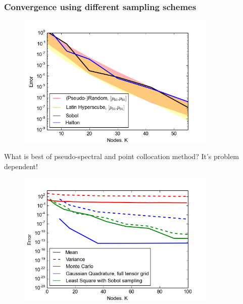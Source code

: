 \documentclass{beamer}
\begin{document}
\begin{frame}
 \frametitle{Convergence using different sampling schemes}
  \begin{figure}
  \includegraphics[width=0.85\textwidth]{convergence_collocation_compare.png}
 \end{figure}
\end{frame}



\begin{frame}{What is best of pseudo-spectral and point collocation method? It's problem dependent!}{}
      \begin{figure}
  \includegraphics[width=0.85\textwidth]{MC_convergence_2D_diff.png}
 \end{figure}
\end{frame}
\end{document}
